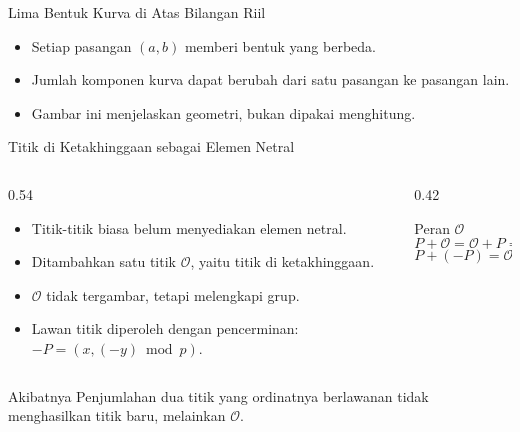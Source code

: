 \documentclass[aspectratio=169,11pt]{beamer}
\begin{document}
\begin{frame}{Lima Bentuk Kurva di Atas Bilangan Riil}
    \centering
    \vspace{0.1cm}
    \begin{itemize}
        \footnotesize
        \item Setiap pasangan $(a,b)$ memberi bentuk yang berbeda.
        \item Jumlah komponen kurva dapat berubah dari satu pasangan ke
              pasangan lain.
        \item Gambar ini menjelaskan geometri, bukan dipakai menghitung.
    \end{itemize}
\end{frame}

\begin{frame}{Titik di Ketakhinggaan sebagai Elemen Netral}
    \begin{columns}[T,onlytextwidth]
        \begin{column}{0.54\textwidth}
            \footnotesize
            \begin{itemize}
                \item Titik-titik biasa belum menyediakan elemen netral.
                \item Ditambahkan satu titik $\mathcal{O}$, yaitu titik di
                      ketakhinggaan.
                \item $\mathcal{O}$ tidak tergambar, tetapi melengkapi
                      grup.
                \item Lawan titik diperoleh dengan pencerminan:
                      $-P = (x,(-y) \bmod p)$.
            \end{itemize}
        \end{column}
        \begin{column}{0.42\textwidth}
            \begin{block}{Peran $\mathcal{O}$}
                \[
                    P + \mathcal{O} = \mathcal{O} + P = P
                \]
                \[
                    P + (-P) = \mathcal{O}
                \]
            \end{block}
        \end{column}
    \end{columns}
    \vspace{0.1cm}
    \begin{alertblock}{Akibatnya}
        \footnotesize
        Penjumlahan dua titik yang ordinatnya berlawanan tidak menghasilkan
        titik baru, melainkan $\mathcal{O}$.
    \end{alertblock}
\end{frame}
\end{document}
